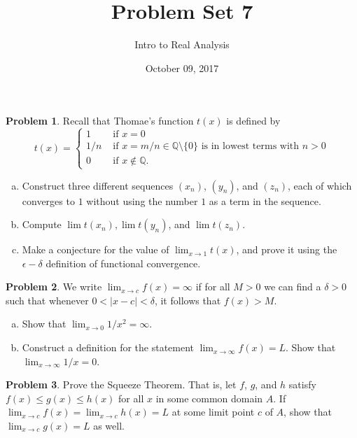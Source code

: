\documentclass{amsart}
\newcommand{\+}[1]{\ensuremath{\mathbf{#1}}}
\theoremstyle{definition}
\newtheorem{prob}{Problem}
\begin{document}
\title{Problem Set 7}
\date{October 09, 2017}
\author{Intro to Real Analysis}

\maketitle


\begin{prob}
 Recall that Thomae's function $t(x)$ is defined by
 \[
 t(x) =
 \begin{cases}
  1 &\text{ if } x = 0 \\
  1/n &\text{ if } x = m/n \in \mathbb{Q} \setminus \{0\} \text{ is in lowest terms with } n>0 \\
  0 &\text{ if } x \not\in \mathbb{Q}.
 \end{cases}
 \]
\begin{enumerate}[(a)]
 \item Construct three different sequences $(x_n)$, $(y_n)$, and $(z_n)$,
 each of which converges to $1$ without using the number $1$ as a term in the sequence.
 \item Compute $\lim t(x_n), \lim t(y_n)$, and $\lim t(z_n)$.
 \item Make a conjecture for the value of $\lim_{x \to 1} t(x)$, and prove it
 using the $\epsilon-\delta$ definition of functional convergence.
\end{enumerate}
 \end{prob}

 
 \begin{prob}
  We write $\lim_{x \to c} f(x) = \infty$ if for all $M > 0$ we can find a $\delta > 0$
  such that whenever $0 < |x-c| <\delta$, it follows that $f(x) > M$.
  \begin{enumerate}[(a)]
   \item Show that $\lim_{x \to 0} {1}/{x^2} = \infty$.
   \item Construct a definition for the statement $\lim_{x \to \infty} f(x) = L$.
   Show that $\lim_{x \to \infty} 1/x = 0$.
  \end{enumerate}
 \end{prob}

\begin{prob}
Prove the Squeeze Theorem.  That is,
 let $f$, $g$, and $h$ satisfy $f(x) \leq g(x) \leq h(x)$ for all $x$ in some common domain $A$.
 If $\lim_{x \to c} f(x) = \lim_{x \to c} h(x) = L$ at some limit point $c$ of $A$, show that
 $\lim_{x \to c} g(x) = L$ as well.
\end{prob}
\end{document}
